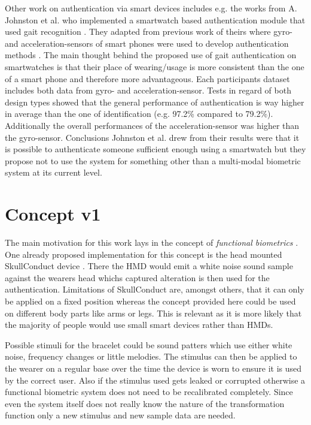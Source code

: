 Other work on authentication via smart devices includes e.g. the works from A. Johnston et al. who implemented a smartwatch based authentication module that used gait recognition \cite{johnston2015smartwatch}.
They adapted from previous work of theirs where gyro- and acceleration-sensors of smart phones were used to develop authentication methods \cite{kwapisz2010cell}.
The main thought behind the proposed use of gait authentication on smartwatches is that their place of wearing/usage is more consistent than the one of a smart phone and therefore more advantageous.
Each participants dataset includes both data from gyro- and acceleration-sensor.
Tests in regard of both design types showed that the general performance of authentication is way higher in average than the one of identification (e.g. 97.2\% compared to 79.2\%).
Additionally the overall performances of the acceleration-sensor was higher than the gyro-sensor.
Conclusions Johnston et al. drew from their results were that it is possible to authenticate someone sufficient enough using a smartwatch but they propose not to use the system for something other than a multi-modal biometric system at its current level. 
\newpage
\section{Concept v1}
The main motivation for this work lays in the concept of \textit{functional biometrics} \cite{schneegass2020functbiometric}.
One already proposed implementation for this concept is the head mounted SkullConduct device \cite{SkullConduct}.
There the HMD would emit a white noise sound sample against the wearers head whichs captured alteration is then used for the authentication.
Limitations of SkullConduct are, amongst others, that it can only be applied on a fixed position whereas the concept provided here could be used on different body parts like arms or legs.
This is relevant as it is more likely that the majority of people would use small smart devices rather than HMDs.

Possible stimuli for the bracelet could be sound patters which use either white noise, frequency changes or little melodies.
The stimulus can then be applied to the wearer on a regular base over the time the device is worn to ensure it is used by the correct user.
Also if the stimulus used gets leaked or corrupted otherwise a functional biometric system does not need to be recalibrated completely.
Since even the system itself does not really know the nature of the transformation function only a new stimulus and new sample data are needed.

